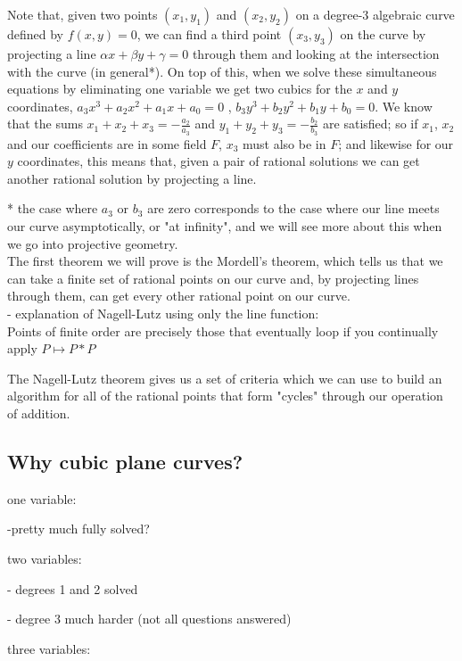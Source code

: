 \documentclass{article}
\begin{document}
Note that, given two points $(x_1, y_1)$ and $(x_2, y_2)$ on a degree-3 algebraic curve defined by $f(x, y) = 0$, we can find a third point $(x_3, y_3)$ on the curve by projecting a line $\alpha x + \beta y + \gamma = 0$ through them and looking at the intersection with the curve (in general*). On top of this, when we solve these simultaneous equations by eliminating one variable we get two cubics for the $x$ and $y$ coordinates, $a_3 x^3 + a_2 x^2 + a_1 x + a_0 = 0$ , \quad $b_3 y^3 + b_2 y^2 + b_1 y + b_0 = 0$. We know that the sums $x_1 + x_2 + x_3 = -\frac{a_2}{a_3}$ and $y_1 + y_2 + y_3 = -\frac{b_2}{b_3}$ are satisfied; so if $x_1$, $x_2$ and our coefficients are in some field $F$, $x_3$ must also be in $F$; and likewise for our $y$ coordinates, this means that, given a pair of rational solutions we can get another rational solution by projecting a line.

* the case where $a_3$ or $b_3$ are zero corresponds to the case where our line meets our curve asymptotically, or "at infinity", and we will see more about this when we go into projective geometry.
\\ 

The first theorem we will prove is the Mordell's theorem, which tells us that we can take a finite set of rational points on our curve and, by projecting lines through them, can get every other rational point on our curve.\\

- explanation of Nagell-Lutz using only the line function:\\
Points of finite order are precisely those that eventually loop if you continually apply $P \mapsto P*P$

The Nagell-Lutz theorem gives us a set of criteria which we can use to build an algorithm for all of the rational points that form "cycles" through our operation of addition.\\

\subsection{Why cubic plane curves?}

one variable:

-pretty much fully solved?

two variables:

- degrees 1 and 2 solved

- degree 3 much harder (not all questions answered)

three variables:
\end{document}

